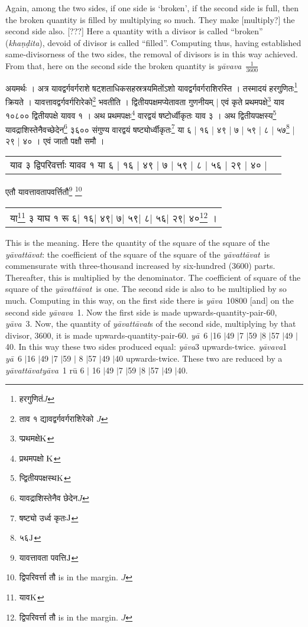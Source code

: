 \documentclass[11pt,a5paper]{book}
\def\yavattavat{\textit{y\=avatt\=avat}}
\def\ya{\textit{y\=a}}
\def\yava{\textit{y\=ava}}
\def\yavava{\textit{y\=avava}}
\def\danda{$|$}
\begin{document}
Again, among the two sides, if one side is `broken', if the second side is full, then the broken quantity is filled by multiplying so much. They make [multiply?] the second side also. [???] Here a quantity with a divisor is called
“broken” (\textit{kha\d n\d dita}), devoid of divisor is called “filled”. Computing thus, having established same-divisorness of the two sides, the removal of divisors is in this way achieved. From that, here on the second side  
the broken quantity is \yavava\ $\frac{1}{3600}$

\newpage 
{\s अयमर्थः ।
अत्र यावद्वर्गवर्गराशे षट्शताधिकसहस्रत्रयमितोंऽशो
यावद्वर्गवर्गराशिरस्ति । 
तस्मादयं हरगुणितः\footnote{{\s हरगुणितं}$J$} क्रियते । यावत्तावद्वर्गवर्गरािरेको\footnote{{\s ताव १ द्यावद्वर्गवर्गराशिरेको} $J$} 
भवतीति । 
द्वितीयपक्षमप्येतावता गुणनीयम् | 
एवं कृते
प्रथमपक्षे\footnote{{\s प्प्रथमक्षे}${\rm K}$}
याव १०८०० द्वितीयपक्षे यावव १ । अथ प्रथमपक्षः\footnote{{\s प्रथमपक्षो }${\rm K}$}
वारद्वयं षष्टोर्ध्वीकृतः याव ३ ।
अथ द्वितीयपक्षस्य\footnote{{\s प्द्वितीयपक्षस्थ}${\rm K}$} यावद्राशिस्तेनैवच्छेदेन\footnote{{\s यावद्राशिस्तेनैव छेदेन}$J$} ३६००
संगुण्य वारद्वयं षष्ट्योर्ध्वीकृतः\footnote{{\s षष्ट्यो उर्ध्व कृतः}${\rm J}$}
या ६ | १६ | ४९ | ७ | ५९ | ८ | ५७\footnote{{\s ५६}${\rm J}$} | २९ | ४० । 
एवं जातौ पक्षौ समौ ।
\begin{tabular}{c | c }
{\s याव ३ द्विपरिवर्त्ताः }						
{\s यावव १ या ६ | १६ | ४९ | ७ | ५९ | ८ | ५६ | २९ | ४० |}	
\end{tabular}
एतौ यावत्तावतापवर्त्तितौ\footnote{{\s यावत्तावता पवत्ति}${\rm J}$} \footnote{{\s द्विपरिवर्त्ता तौ} is in the margin. $J$}
\begin{tabular}{c}
{\s या\footnote{{\s याव}${\rm K}$} ३ 			
{\s याघ १ रू ६| १६| ४९| ७| ५९| ८| ५६| २९| ४०\footnote{{\s द्विपरिवर्त्ता तौ} is in the margin. $J$} ।} 	
}
\end{tabular} 


\newpage 
This is the meaning.  Here the quantity  of the square of the square of the \yavattavat: the coefficient of the square of the square of the \yavattavat\ is commensurate with three-thousand increased by six-hundred (3600) parts. Thereafter, this is multiplied by the denominator. The coefficient of square of the square of the \yavattavat\ is one. The second side is also to be multiplied by so much.  Computing in this way, on the first side there is \yava\ 10800 [and] on the second side \yavava\ 1. Now the 
first side is made upwards-quantity-pair-60, \yava\ 3.  Now, the quantity of \yavattavat s 
of the second side, multiplying by that divisor, 3600, it is made upwards-quantity-pair-60. 
\ya\ 6 \danda 16 \danda 49 \danda 7 \danda 59 \danda 8 \danda 57 \danda 49 \danda 40.  In this way these two sides  produced equal: \yava 3 upwards-twice. \yavava 1 \ya\ 6 \danda 16 \danda 49 \danda 7 \danda 59 \danda 
8 \danda 57 \danda 49 \danda 40 upwards-twice. These two are reduced 
by a \yavattavat  \yava\ 1 r\=u 6 \danda 
16 \danda 49 \danda 7 \danda 59 \danda 8 \danda 57 \danda 49 \danda 40.




}
\end{document}
